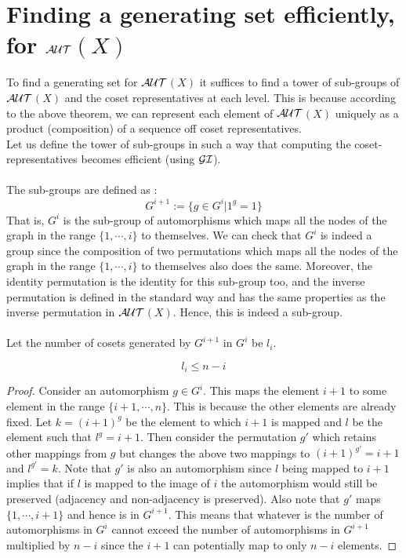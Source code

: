 \section{Finding a generating set efficiently, for $\cal{AUT}$$(X)$}
To find a generating set for $\cal{AUT}$$(X)$ it suffices to find a tower of sub-groups of $\cal{AUT}$$(X)$ and the 
coset representatives at each level. This is because according to the above theorem, we can represent each element of $\cal{AUT}$$(X)$ uniquely as a product (composition) of a sequence off coset representatives.\\
Let us define the tower of sub-groups in such a way that computing the coset-representatives becomes efficient (using $\cal{GI}$).\\\\
The sub-groups are defined as :
$$G^{i+1} := \{ g \in G^{i} | 1^{g} = 1\}$$
That is, $G^{i}$ is the sub-group of automorphisms which maps all the nodes of the graph in the range $\{1, \cdots, i\}$ to themselves. We can check that $G^{i}$ is indeed a group since the composition of two permutations which maps all the nodes of the graph in the range $\{1, \cdots, i\}$ to themselves also does the same. Moreover, the identity permutation is the identity for this sub-group too, and the inverse permutation is defined in the standard way and has the same properties as the inverse permutation in $\cal{AUT}$$(X)$. Hence, this is indeed a sub-group.\\\\
Let the number of cosets generated by $G^{i+1}$ in $G^{i}$ be $l_{i}$.
\begin{claim}
$$l_{i} \le n-i$$\end{claim}
\begin{proof}
Consider an automorphism $g \in G^{i}$. This maps the element $i+1$ to some element in the range $\{i+1, \cdots, n\}$. This is because the other elements are already fixed. Let $k = (i+1)^{g}$ be the element to which $i+1$ is mapped and $l$ be the element such that $l^{g}= i+1$. Then consider the permutation $g'$ which retains other mappings from $g$ but changes the above two mappings to $(i+1)^{g'} = i+1$ and $l^{g'} = k$. Note that $g'$ is also an automorphism since $l$ being mapped to $i+1$ implies that if $l$ is mapped to the image of $i$ the automorphism would still be preserved (adjacency and non-adjacency is preserved). Also note that $g'$ maps $\{1, \cdots , i+1\}$ and hence is in $G^{i+1}$. This means that whatever is the number of automorphisms in $G^{i}$ cannot exceed the number of automorphisms in $G^{i+1}$ multiplied by $n-i$ since the $i+1$ can potentially map to only $n-i$ elements.
\end{proof}

